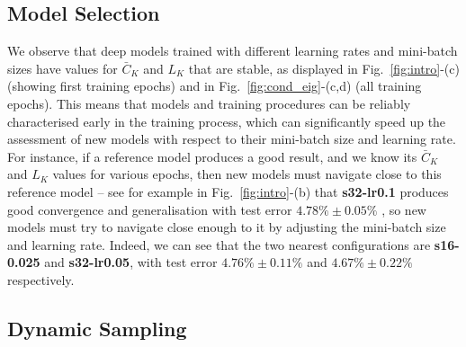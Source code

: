 \documentclass[10pt,journal,compsoc]{IEEEtran}
\begin{document}
\subsection{Model Selection}

We observe that deep models trained with different learning rates and mini-batch sizes have values for $\bar{C}_K$ and $L_K$ that are stable, as displayed in Fig.~\ref{fig:intro}-(c) (showing first training epochs) and in Fig.~\ref{fig:cond_eig}-(c,d) (all training epochs).
This means that models and training procedures can be reliably characterised early in the training process, which can significantly speed up the assessment of new models with respect to their mini-batch size and learning rate.
For instance, if a reference model produces a good result, and we know its $\bar{C}_K$ and $L_K$ values for various epochs, then new models must navigate close to this reference model -- see for example in Fig.~\ref{fig:intro}-(b) that {\bf s32-lr0.1} produces good convergence and generalisation with test error $4.78\%\pm0.05\%$ , so new models must try to navigate close enough to it by adjusting the mini-batch size and learning rate.
Indeed, we can see that the two nearest configurations are {\bf s16-0.025} and {\bf s32-lr0.05}, with test error $4.76\%\pm0.11\%$ and $4.67\%\pm0.22\%$ respectively.



\subsection{Dynamic Sampling}
\label{sec:dynamic_sampling}
\end{document}
